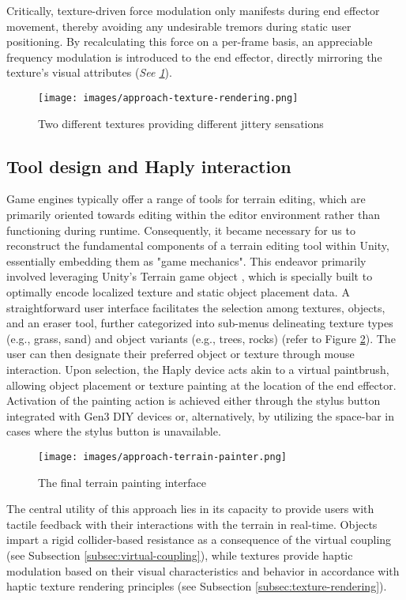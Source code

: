 Critically, texture-driven force modulation only manifests during end effector movement, thereby avoiding any undesirable tremors during static user positioning. By recalculating this force on a per-frame basis, an appreciable frequency modulation is introduced to the end effector, directly mirroring the texture's visual attributes (\textit{See \ref{fig:texture-rendering}}).

\begin{figure}[htbp]
    \centering
    \texttt{[image: images/approach-texture-rendering.png]} 
    \caption{Two different textures providing different jittery sensations}
    \label{fig:texture-rendering}
\end{figure}

\subsection{Tool design and Haply interaction} \label{subsec:terrain-painting}

Game engines typically offer a range of tools for terrain editing, which are primarily oriented towards editing within the editor environment rather than functioning during runtime. Consequently, it became necessary for us to reconstruct the fundamental components of a terrain editing tool within Unity, essentially embedding them as "game mechanics". This endeavor primarily involved leveraging Unity's Terrain game object \cite{unityterrain}, which is specially built to optimally encode localized texture and static object placement data. A straightforward user interface facilitates the selection among textures, objects, and an eraser tool, further categorized into sub-menus delineating texture types (e.g., grass, sand) and object variants (e.g., trees, rocks) (refer to Figure \ref{fig:terrain-painting}). The user can then designate their preferred object or texture through mouse interaction. Upon selection, the Haply device acts akin to a virtual paintbrush, allowing object placement or texture painting at the location of the end effector. Activation of the painting action is achieved either through the stylus button integrated with Gen3 DIY devices or, alternatively, by utilizing the space-bar in cases where the stylus button is unavailable.

\begin{figure}[htbp]
    \centering
    \texttt{[image: images/approach-terrain-painter.png]} 
    \caption{The final terrain painting interface}
    \label{fig:terrain-painting}
\end{figure}

The central utility of this approach lies in its capacity to provide users with tactile feedback with their interactions with the terrain in real-time. Objects impart a rigid collider-based resistance as a consequence of the virtual coupling (see Subsection \ref{subsec:virtual-coupling}), while textures provide haptic modulation based on their visual characteristics and behavior in accordance with haptic texture rendering principles (see Subsection \ref{subsec:texture-rendering}).
